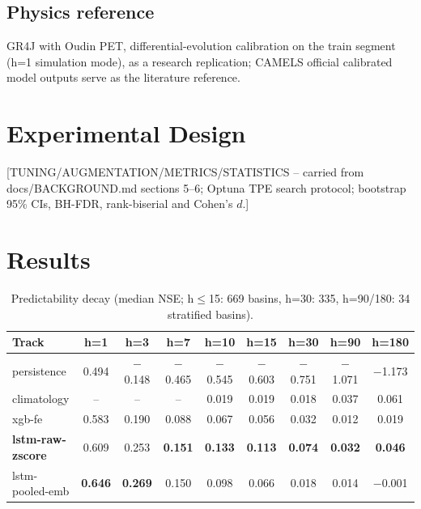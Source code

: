 \documentclass[11pt]{article}
\begin{document}
\subsection{Physics reference}
GR4J \citep{perrin2003} with Oudin PET, differential-evolution calibration on
the train segment (h=1 simulation mode), as a research replication; CAMELS
official calibrated model outputs serve as the literature reference.

\section{Experimental Design}
[TUNING/AUGMENTATION/METRICS/STATISTICS -- carried from docs/BACKGROUND.md
sections 5--6; Optuna TPE search protocol; bootstrap 95\% CIs, BH-FDR,
rank-biserial and Cohen's $d$.]

\section{Results}

\begin{table}[t]
\centering\small
\caption{Predictability decay (median NSE; h$\le$15: 669 basins, h=30: 335,
h=90/180: 34 stratified basins).}
\label{tab:decay}
\begin{tabular}{lcccccccc}
\toprule
Track & h=1 & h=3 & h=7 & h=10 & h=15 & h=30 & h=90 & h=180 \\
\midrule
persistence & 0.494 & $-$0.148 & $-$0.465 & $-$0.545 & $-$0.603 & $-$0.751 & $-$1.071 & $-$1.173 \\
climatology & -- & -- & -- & 0.019 & 0.019 & 0.018 & 0.037 & 0.061 \\
xgb-fe & 0.583 & 0.190 & 0.088 & 0.067 & 0.056 & 0.032 & 0.012 & 0.019 \\
\textbf{lstm-raw-zscore} & 0.609 & 0.253 &  \textbf{0.151} & \textbf{0.133} & \textbf{0.113} & \textbf{0.074} & \textbf{0.032} & \textbf{0.046} \\
lstm-pooled-emb & \textbf{0.646} & \textbf{0.269} & 0.150 & 0.098 & 0.066 & 0.018 & 0.014 & $-$0.001 \\
\bottomrule
\end{tabular}
\end{table}
\end{document}
